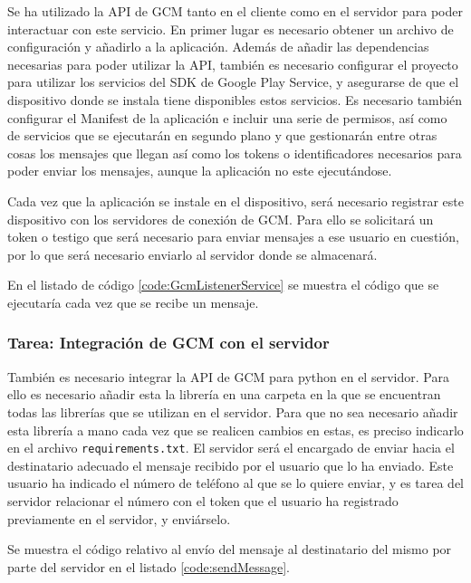 Se ha utilizado la \ac{API} de \ac{GCM} tanto en el cliente como en el servidor para poder interactuar con este servicio. En primer lugar es necesario obtener un archivo de configuración y añadirlo a la aplicación. Además de añadir las dependencias necesarias para poder utilizar la \ac{API}, también es necesario configurar el proyecto para utilizar los servicios del \acs{SDK} de Google Play Service, y asegurarse de que el dispositivo donde se instala tiene disponibles estos servicios. Es necesario también configurar el Manifest de la aplicación e incluir una serie de permisos, así como de servicios que se ejecutarán en segundo plano y que gestionarán entre otras cosas los mensajes que llegan así como los tokens o identificadores necesarios para poder enviar los mensajes, aunque la aplicación no este ejecutándose.

Cada vez que la aplicación se instale en el dispositivo, será necesario registrar este dispositivo con los servidores de conexión de \ac{GCM}. Para ello se solicitará un token o testigo que será necesario para enviar mensajes a ese usuario en cuestión, por lo que será necesario enviarlo al servidor donde se almacenará.

En el listado de código \ref{code:GcmListenerService} se muestra el código que se ejecutaría cada vez que se recibe un mensaje.



\subsubsection{Tarea: Integración de \ac{GCM} con el servidor}

También es necesario integrar la \ac{API} de \ac{GCM} para python en el servidor. Para ello es necesario añadir esta la librería en una carpeta en la que se encuentran todas las librerías que se utilizan en el servidor. Para que no sea necesario añadir esta librería a mano cada vez que se realicen cambios en estas, es preciso indicarlo en el archivo \texttt{requirements.txt}. El servidor será el encargado de enviar hacia el destinatario adecuado el mensaje recibido por el usuario que lo ha enviado. Este usuario ha indicado el número de teléfono al que se lo quiere enviar, y es tarea del servidor relacionar el número con el token que el usuario ha registrado previamente en el servidor, y enviárselo.

Se muestra el código relativo al envío del mensaje al destinatario del mismo por parte del servidor en el listado \ref{code:sendMessage}.


